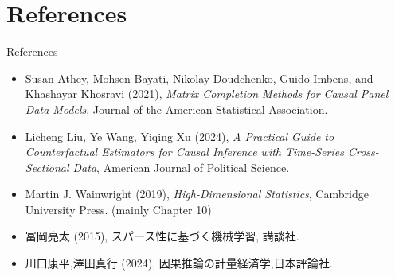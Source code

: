 \documentclass[xcolor=svgnames,aspectratio=169]{beamer}
\begin{document}
\section{References}

\begin{frame}{References}
    \begin{itemize}
        \item Susan Athey, Mohsen Bayati, Nikolay Doudchenko, Guido Imbens, and Khashayar Khosravi (2021), \textit{Matrix Completion Methods for Causal Panel Data Models}, Journal of the American Statistical Association.
        \item Licheng Liu, Ye Wang, Yiqing Xu (2024), \textit{A Practical Guide to Counterfactual Estimators for Causal Inference with Time-Series Cross-Sectional Data},  American Journal of Political Science.
        \item Martin J. Wainwright (2019), \textit{High-Dimensional Statistics}, Cambridge University Press. (mainly Chapter 10)
        \item 冨岡亮太 (2015), スパース性に基づく機械学習, 講談社.
        \item 川口康平,澤田真行 (2024), 因果推論の計量経済学,日本評論社.
    \end{itemize}
\end{frame}
\end{document}
